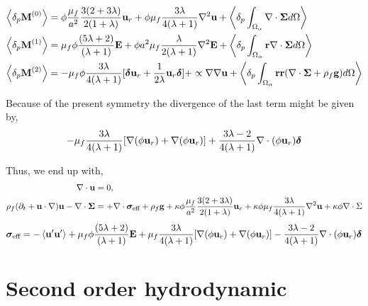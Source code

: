 \documentclass[12pt]{My_preprint}
\begin{document}
\begin{align}
    \left<\delta_{p} \textbf{M}^{(0)}\right> 
    &=
    \phi
    \frac{\mu_f}{a^2}
    \frac{3(2+3\lambda)}{2(1+\lambda)}\textbf{u}_r
    + \phi\mu_f  \frac{3\lambda}{4(\lambda +1)} \mathbf{\nabla}^2 \textbf{u}
    + \left<\delta_{p} \int_{\Omega_{\alpha}} \mathbf{\nabla}\cdot\bm\Sigma d\Omega\right>
    \\
    \left<\delta_{p} \textbf{M}^{(1)}\right> 
    &= \mu_f \phi 
    \frac{(5\lambda +2)}{(\lambda +1)}\textbf{E} 
    + \phi a^2 \mu_f \frac{\lambda}{2(\lambda +1)}\mathbf{\nabla}^2 \textbf{E}
    + \left<\delta_{p} \int_{\Omega_{\alpha}} \textbf{r}\mathbf{\nabla}\cdot\bm\Sigma d\Omega\right>
    \\
    \left<\delta_{p} \textbf{M}^{(2)}\right> 
    &=
    - \mu_f \phi \frac{3\lambda}{4(\lambda +1)}[\bm\delta \textbf{u}_r + \frac{1}{2\lambda}\textbf{u}_r \bm\delta ]
    + \propto \mathbf{\nabla}\mathbf{\nabla} \textbf{u}
    +\left<\delta_{p} \int_{\Omega_{\alpha}} \textbf{rr}(\mathbf{\nabla}\cdot\bm\Sigma+\rho_f \textbf{g}) d\Omega\right>
\end{align}


Because of the present symmetry the divergence of the last term might be given by,
\begin{equation}
    - \mu_f \frac{3\lambda}{4(\lambda +1)}[\mathbf{\nabla} (\phi \textbf{u}_r)+\mathbf{\nabla} (\phi\textbf{u}_r)] + \frac{3\lambda-2}{4(\lambda+1)}\mathbf{\nabla}\cdot (\phi\textbf{u}_r) \bm\delta 
\end{equation} 



Thus, we end up with, 
\begin{align}
    \mathbf{\nabla}\cdot\textbf{u}&=0, \\
    \rho_f (\partial_t 
    + \textbf{u}\cdot \mathbf{\nabla})
    \textbf{u}
    - \mathbf{\nabla}\cdot \bm\Sigma
    &= 
    +\mathbf{\nabla}\cdot \bm{\sigma}_\text{eff} 
    + \rho_f \textbf{g} 
    + \kappa \phi \frac{\mu_f}{a^2} \frac{3(2+3\lambda)}{2(1+\lambda)}\textbf{u}_r
    + \kappa \phi\mu_f  \frac{3\lambda}{4(\lambda +1)} \mathbf{\nabla}^2 \textbf{u}
    + \kappa \phi \mathbf{\nabla}\cdot\Sigma
\end{align}
\begin{align*}
    \bm\sigma_\text{eff}  = 
    - \left< \textbf{u}'\textbf{u}'\right>
    + \mu_f \phi  \frac{(5\lambda +2)}{(\lambda +1)}\textbf{E} 
    + \mu_f \frac{3\lambda}{4(\lambda +1)}[\mathbf{\nabla} (\phi \textbf{u}_r)+\mathbf{\nabla} (\phi\textbf{u}_r)] 
    - \frac{3\lambda-2}{4(\lambda+1)}\mathbf{\nabla}\cdot (\phi\textbf{u}_r) \bm\delta 
\end{align*}

\section{Second order hydrodynamic}
\end{document}
